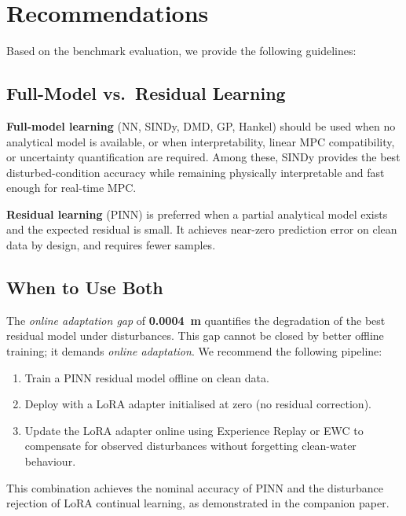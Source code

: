 
\section{Recommendations}
\label{sec:recommendations_bench}

Based on the benchmark evaluation, we provide the following guidelines:

\subsection{Full-Model vs.\ Residual Learning}

\textbf{Full-model learning} (NN, SINDy, DMD, GP, Hankel) should be used when
no analytical model is available, or when interpretability, linear MPC
compatibility, or uncertainty quantification are required. Among these, SINDy
provides the best disturbed-condition accuracy while remaining physically
interpretable and fast enough for real-time MPC.

\textbf{Residual learning} (PINN) is preferred when a partial analytical model
exists and the expected residual is small. It achieves near-zero prediction
error on clean data by design, and requires fewer samples.

\subsection{When to Use Both}

The \textit{online adaptation gap} of \textbf{0.0004~m}
quantifies the degradation of the best residual model under disturbances.
This gap cannot be closed by better offline training; it demands \textit{online
adaptation}. We recommend the following pipeline:
\begin{enumerate}
  \item Train a PINN residual model offline on clean data.
  \item Deploy with a LoRA adapter initialised at zero (no residual correction).
  \item Update the LoRA adapter online using Experience Replay or EWC to
        compensate for observed disturbances without forgetting clean-water behaviour.
\end{enumerate}
This combination achieves the nominal accuracy of PINN and the disturbance
rejection of LoRA continual learning, as demonstrated in the companion paper.
